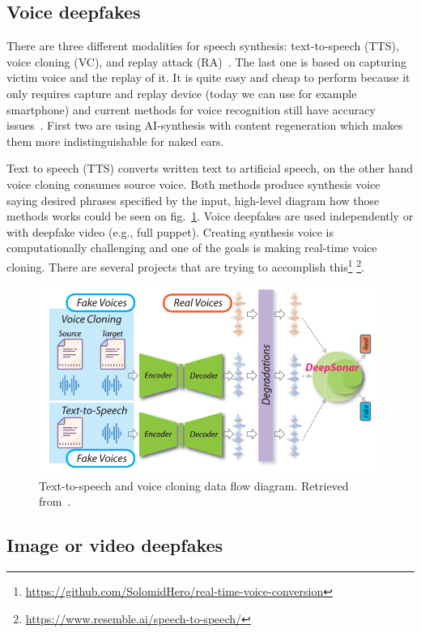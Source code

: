 \subsection{Voice deepfakes}

There are three different modalities for speech synthesis: text-to-speech (TTS), voice cloning (VC), and replay attack (RA)~\cite{Deepsonar}. The last one is based on capturing victim voice and the replay of it. It is quite easy and cheap to perform because it only requires capture and replay device (today we can use for example smartphone) and current methods for voice recognition still have accuracy issues~\cite{ReplayAttackDetection}. First two are using AI-synthesis with content regeneration which makes them more indistinguishable for naked ears.~\cite{Deepsonar}

Text to speech (TTS) converts written text to artificial speech, on the other hand voice cloning consumes source voice. Both methods produce synthesis voice saying desired phrases specified by the input, high-level diagram how those methods works could be seen on fig.~\ref{fig:tts_vs}. Voice deepfakes are used independently or with deepfake video (e.g., full puppet). Creating synthesis voice is computationally challenging and one of the goals is making real-time voice cloning. There are several projects that are trying to accomplish this\footnote{\url{https://github.com/SolomidHero/real-time-voice-conversion}} \footnote{\url{https://www.resemble.ai/speech-to-speech/}}.

\begin{figure}[H]
    \centering
    \includegraphics[width=.62\linewidth]{other-fig/tts_vc.png}
    \caption{Text-to-speech and voice cloning data flow diagram. Retrieved from~\cite{Deepsonar}.}
    \label{fig:tts_vs}
\end{figure}

\subsection{Image or video deepfakes}


